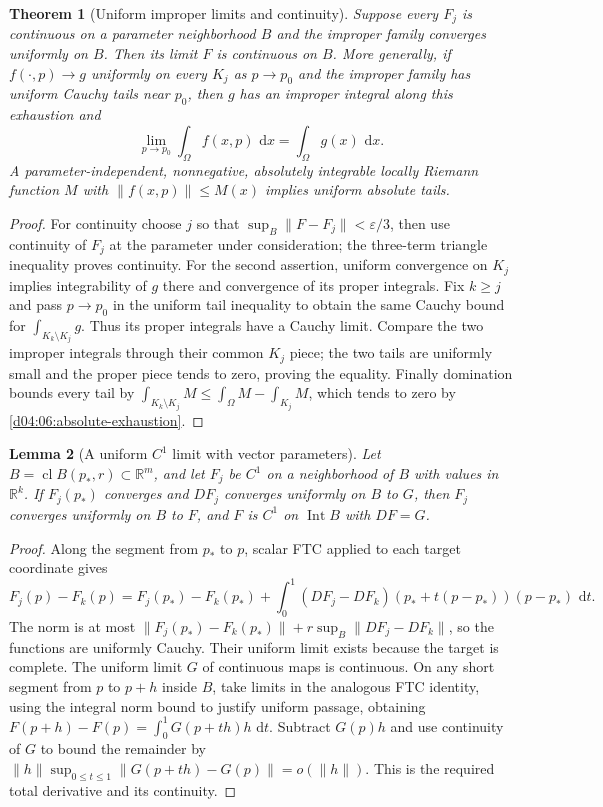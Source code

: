 \documentclass[11pt,oneside,openany]{book}
\newtheorem{theorem}{Theorem}[chapter]
\newtheorem{lemma}[theorem]{Lemma}
\theoremstyle{definition}
\theoremstyle{remark}
\newcommand{\R}{\mathbb R}
\newcommand{\eps}{\varepsilon}
\newcommand{\norm}[1]{\lVert#1\rVert}
\newcommand{\dd}{\,\mathrm d}
\DeclareMathOperator{\Int}{Int}
\DeclareMathOperator{\cl}{cl}
\begin{document}
\begin{theorem}[Uniform improper limits and continuity]\label{d04:08:improper-continuity}
Suppose every $F_j$ is continuous on a parameter neighborhood $B$ and the improper family converges uniformly on $B$. Then its limit $F$ is continuous on $B$. More generally, if $f(\cdot,p)\to g$ uniformly on every $K_j$ as $p\to p_0$ and the improper family has uniform Cauchy tails near $p_0$, then $g$ has an improper integral along this exhaustion and
\[
 \lim_{p\to p_0}\int_\Omega f(x,p)\,\dd x=\int_\Omega g(x)\,\dd x.
\]
A parameter-independent, nonnegative, absolutely integrable locally Riemann function $M$ with $\norm{f(x,p)}\leq M(x)$ implies uniform absolute tails.
\end{theorem}
\begin{proof}
For continuity choose $j$ so that $\sup_B\norm{F-F_j}<\eps/3$, then use continuity of $F_j$ at the parameter under consideration; the three-term triangle inequality proves continuity. For the second assertion, uniform convergence on $K_j$ implies integrability of $g$ there and convergence of its proper integrals. Fix $k\geq j$ and pass $p\to p_0$ in the uniform tail inequality to obtain the same Cauchy bound for $\int_{K_k\setminus K_j}g$. Thus its proper integrals have a Cauchy limit. Compare the two improper integrals through their common $K_j$ piece; the two tails are uniformly small and the proper piece tends to zero, proving the equality. Finally domination bounds every tail by $\int_{K_k\setminus K_j}M\leq\int_\Omega M-\int_{K_j}M$, which tends to zero by \cref{d04:06:absolute-exhaustion}.
\end{proof}

\begin{lemma}[A uniform $C^1$ limit with vector parameters]\label{d04:08:c1-limit}
Let $B=\cl B(p_*,r)\subset\R^m$, and let $F_j$ be $C^1$ on a neighborhood of $B$ with values in $\R^k$. If $F_j(p_*)$ converges and $DF_j$ converges uniformly on $B$ to $G$, then $F_j$ converges uniformly on $B$ to $F$, and $F$ is $C^1$ on $\Int B$ with $DF=G$.
\end{lemma}
\begin{proof}
Along the segment from $p_*$ to $p$, scalar FTC applied to each target coordinate gives
\[
 F_j(p)-F_k(p)=F_j(p_*)-F_k(p_*)+
 \int_0^1(DF_j-DF_k)(p_*+t(p-p_*))(p-p_*)\,\dd t.
\]
The norm is at most $\norm{F_j(p_*)-F_k(p_*)}+r\sup_B\norm{DF_j-DF_k}$, so the functions are uniformly Cauchy. Their uniform limit exists because the target is complete. The uniform limit $G$ of continuous maps is continuous. On any short segment from $p$ to $p+h$ inside $B$, take limits in the analogous FTC identity, using the integral norm bound to justify uniform passage, obtaining
$F(p+h)-F(p)=\int_0^1G(p+th)h\,\dd t$. Subtract $G(p)h$ and use continuity of $G$ to bound the remainder by $\norm h\sup_{0\leq t\leq1}\norm{G(p+th)-G(p)}=o(\norm h)$. This is the required total derivative and its continuity.
\end{proof}
\end{document}
